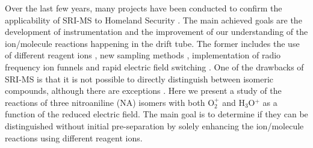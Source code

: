 Over the last few years, many projects have been conducted to confirm the applicability of SRI-MS to Homeland Security \cite{mayhew2010applications,sulzer2012proton,kassebacher2013investigations,RN445,shen2009triacetone,jurschik2010proton,sulzer2013applications,agarwal2014sensitivity,RF_TNT,gonzalez2017development,doi:10.1021/acs.analchem.7b05211,doi:10.1002/rcm.4334,gonzalez2019applications}.  
The main achieved goals are the development of instrumentation and the improvement of our understanding of the ion/molecule reactions happening in the drift tube.
The former includes the use of different reagent ions \cite{RN1254}, new sampling methods \cite{RN445}, implementation of radio frequency ion funnels  \cite{RF_TNT,barber2012increased} and rapid electric field switching \cite{doi:10.1021/acs.analchem.7b05211}. 
One of the drawbacks of SRI-MS is that %
it is not possible to directly distinguish between isomeric compounds, although there are  exceptions  \cite{lanza2013distinguishing}. 
Here we present a study of the reactions of three nitroaniline (NA) isomers with both O$_2^+$ and H$_3$O$^+$ as a function of the reduced electric field. The main goal is to determine if they can be distinguished without initial pre-separation by solely enhancing the ion/molecule reactions using different reagent ions.




